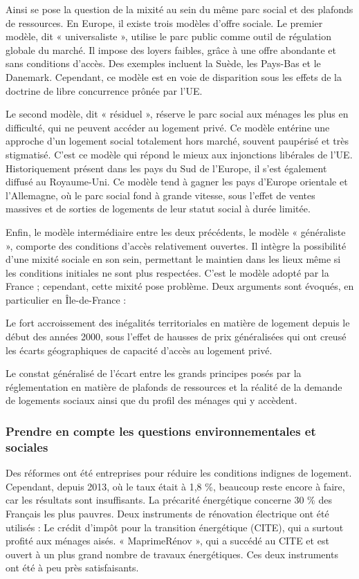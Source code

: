 \documentclass[a4paper, 12pt]{report}
\begin{document}
Ainsi se pose la question de la mixité au sein du même parc social et des plafonds de ressources. En Europe, il existe trois modèles d’offre sociale. Le premier modèle, dit « universaliste », utilise le parc public comme outil de régulation globale du marché. Il impose des loyers faibles, grâce à une offre abondante et sans conditions d’accès. Des exemples incluent la Suède, les Pays-Bas et le Danemark. Cependant, ce modèle est en voie de disparition sous les effets de la doctrine de libre concurrence prônée par l’UE.

Le second modèle, dit « résiduel », réserve le parc social aux ménages les plus en difficulté, qui ne peuvent accéder au logement privé. Ce modèle entérine une approche d’un logement social totalement hors marché, souvent paupérisé et très stigmatisé. C’est ce modèle qui répond le mieux aux injonctions libérales de l’UE. Historiquement présent dans les pays du Sud de l’Europe, il s’est également diffusé au Royaume-Uni. Ce modèle tend à gagner les pays d’Europe orientale et l’Allemagne, où le parc social fond à grande vitesse, sous l’effet de ventes massives et de sorties de logements de leur statut social à durée limitée.

Enfin, le modèle intermédiaire entre les deux précédents, le modèle « généraliste », comporte des conditions d’accès relativement ouvertes. Il intègre la possibilité d’une mixité sociale en son sein, permettant le maintien dans les lieux même si les conditions initiales ne sont plus respectées. C’est le modèle adopté par la France ; cependant, cette mixité pose problème. Deux arguments sont évoqués, en particulier en Île-de-France : 

Le fort accroissement des inégalités territoriales en matière de logement depuis le début des années 2000, sous l’effet de hausses de prix généralisées qui ont creusé les écarts géographiques de capacité d’accès au logement privé.

Le constat généralisé de l’écart entre les grands principes posés par la réglementation en matière de plafonds de ressources et la réalité de la demande de logements sociaux ainsi que du profil des ménages qui y accèdent.

\subsubsection{Prendre en compte les questions environnementales et sociales}

Des réformes ont été entreprises pour réduire les conditions indignes de logement. Cependant, depuis 2013, où le taux était à 1,8 \%, beaucoup reste encore à faire, car les résultats sont insuffisants. La précarité énergétique concerne 30 \% des Français les plus pauvres. Deux instruments de rénovation électrique ont été utilisés : Le crédit d’impôt pour la transition énergétique (CITE), qui a surtout profité aux ménages aisés. « MaprimeRénov », qui a succédé au CITE et est ouvert à un plus grand nombre de travaux énergétiques. Ces deux instruments ont été à peu près satisfaisants.
\end{document}
